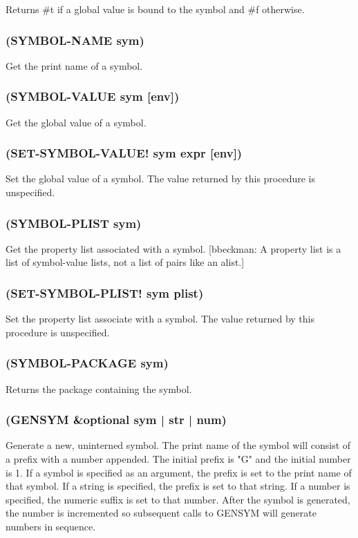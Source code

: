 \documentclass[11pt]{article}
\begin{document}
Returns \#t if a global value is bound to the symbol and \#f otherwise.
\subsubsection{(SYMBOL-NAME sym)}
\label{sec-4-16-2}

Get the print name of a symbol.
\subsubsection{(SYMBOL-VALUE sym [env])}
\label{sec-4-16-3}

Get the global value of a symbol.
\subsubsection{(SET-SYMBOL-VALUE! sym expr [env])}
\label{sec-4-16-4}

Set the global value of a symbol.  The value returned by this
procedure is unspecified.
\subsubsection{(SYMBOL-PLIST sym)}
\label{sec-4-16-5}

Get the property list associated with a symbol.  [bbeckman: A
property list is a list of symbol-value lists, not a list of pairs
like an alist.]
\subsubsection{(SET-SYMBOL-PLIST! sym plist)}
\label{sec-4-16-6}

Set the property list associate with a symbol.  The value returned by
this procedure is unspecified.
\subsubsection{(SYMBOL-PACKAGE sym)}
\label{sec-4-16-7}

Returns the package containing the symbol.
\subsubsection{(GENSYM \&optional sym | str | num)}
\label{sec-4-16-8}

Generate a new, uninterned symbol.  The print name of the symbol will
consist of a prefix with a number appended.  The initial prefix is
"G" and the initial number is 1.  If a symbol is specified as an
argument, the prefix is set to the print name of that symbol.  If a
string is specified, the prefix is set to that string.  If a number
is specified, the numeric suffix is set to that number.  After the
symbol is generated, the number is incremented so subsequent calls to
GENSYM will generate numbers in sequence.
\end{document}
